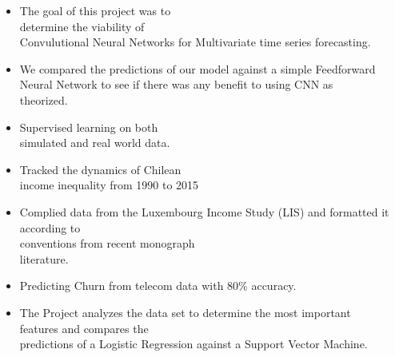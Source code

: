 









\begin{itemize}
\item The goal of this project was to \\ determine the viability of\\ Convulutional Neural Networks for Multivariate time series forecasting. 
\item We compared the predictions of our model against a simple Feedforward Neural Network to see if there was any benefit to using CNN as \\theorized. 
\item Supervised learning on both\\ simulated and real world data.
\end{itemize}
\smallskip
{}
\begin{itemize}
\item Tracked the dynamics of Chilean\\ income inequality from 1990 to 2015
\item Complied data from the Luxembourg Income Study (LIS) and formatted it according to \\ conventions from recent monograph \\ literature.
\end{itemize}
\smallskip
{}
\begin{itemize}
\item Predicting Churn from telecom data with 80\% accuracy.
\item The Project analyzes the data set to determine the most important \\ features and compares the \\ predictions of a Logistic Regression against a Support Vector Machine. 

\end{itemize}
\smallskip


